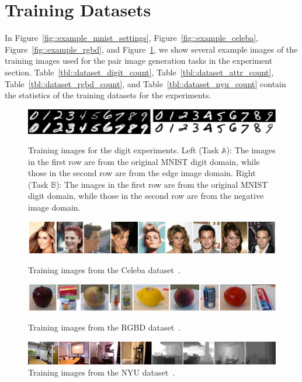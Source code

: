 
\section{Training Datasets}\label{subsec::datasets}

In Figure~\ref{fig::example_mnist_settings}, Figure~\ref{fig::example_celeba}, Figure~\ref{fig::example_rgbd}, and Figure~\ref{fig::example_nyu}, we show several example images of the training images used for the pair image generation tasks in the experiment section. Table~\ref{tbl::dataset_digit_count}, Table~\ref{tbl::dataset_attr_count}, Table~\ref{tbl::dataset_rgbd_count}, and Table~\ref{tbl::dataset_nyu_count} contain the statistics of the training datasets for the experiments.

\begin{figure}[tbh!]
\centering
\includegraphics[trim=0.00in 0.0in 0.00in 0in,width=1.0\textwidth]{example_mnist_settings.pdf}
\caption{Training images for the digit experiments. Left (Task $\mathbb{A}$): The images in the first row are from the original MNIST digit domain, while those in the second row are from the edge image domain. Right (Task $\mathbb{B}$): The images in the first row are from the original MNIST digit domain, while those in the second row are from the negative image domain.}
\label{fig::example_mnist_settings}
\vspace{1mm}
\includegraphics[trim=0.00in 0.0in 0.00in 0in,width=1.0\textwidth]{example_celeba.pdf}
\caption{Training images from the Celeba dataset~\cite{liu2015deep}.}
\label{fig::example_celeba}
\vspace{1mm}
\includegraphics[trim=0.00in 0.0in 0.00in 0in,width=1.0\textwidth]{example_rgbd.pdf}
\caption{Training images from the RGBD dataset~\cite{lai2011large}.}
\label{fig::example_rgbd}
\vspace{1mm}
\includegraphics[trim=0.00in 0.0in 0.00in 0in,width=1.0\textwidth]{example_nyu.pdf}
\caption{Training images from the NYU dataset~\cite{silberman2012indoor}.}
\label{fig::example_nyu}
\end{figure}
